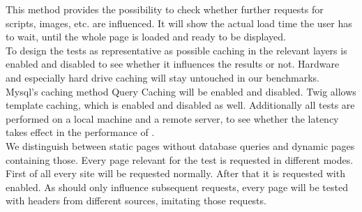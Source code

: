 This method provides the possibility to check whether further requests for scripts, images, etc. are influenced.
It will show the actual load time the user has to wait, until the whole page is loaded and ready to be displayed.
\\
To design the tests as representative as possible caching in the relevant layers is enabled and disabled to see whether it influences the results or not.
Hardware and especially hard drive caching will stay untouched in our benchmarks.
\\
Mysql's caching method Query Caching will be enabled and disabled.
Twig allows template caching, which is enabled and disabled as well.
Additionally all tests are performed on a local machine and a remote server, to see whether the latency takes effect in the performance of \lare{}.
\\
We distinguish between static pages without database queries and dynamic pages containing those.
Every page relevant for the test is requested in different modes.
First of all every site will be requested normally.
After that it is requested with \lare{} enabled.
As \lare{} should only influence subsequent requests, every page will be tested with \http{} headers from different sources, imitating those requests.

%
%
%


